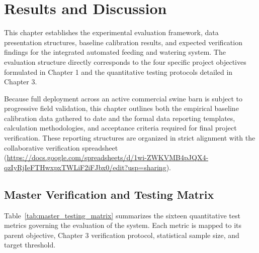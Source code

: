 
\chapter{Results and Discussion}
\label{chap:results}

This chapter establishes the experimental evaluation framework, data presentation structures, baseline calibration results, and expected verification findings for the integrated automated feeding and watering system. The evaluation structure directly corresponds to the four specific project objectives formulated in Chapter 1 and the quantitative testing protocols detailed in Chapter 3.

Because full deployment across an active commercial swine barn is subject to progressive field validation, this chapter outlines both the empirical baseline calibration data gathered to date and the formal data reporting templates, calculation methodologies, and acceptance criteria required for final project verification. These reporting structures are organized in strict alignment with the collaborative verification spreadsheet (\url{https://docs.google.com/spreadsheets/d/1wi-ZWKVMB4pJQX4-qzIyRjIeFTHwxpxTWLiF2iFJbx0/edit?usp=sharing}).

\section{Master Verification and Testing Matrix}
\label{sec:master_matrix}

Table~\ref{tab:master_testing_matrix} summarizes the sixteen quantitative test metrics governing the evaluation of the system. Each metric is mapped to its parent objective, Chapter 3 verification protocol, statistical sample size, and target threshold.

